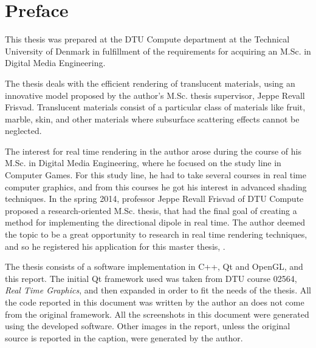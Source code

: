 \chapter{Preface}

\vspace{1cm}
This thesis was prepared at the DTU Compute department at the Technical University of Denmark in fulfillment of the requirements for acquiring an M.Sc. in Digital Media Engineering. 

The thesis deals with the efficient rendering of translucent materials, using an innovative model proposed by the author's M.Sc. thesis supervisor, Jeppe Revall Frisvad. Translucent materials consist of a particular class of materials like fruit, marble, skin, and other materials where subsurface scattering effects cannot be neglected. 

The interest for real time rendering in the author arose during the course of his M.Sc. in Digital Media Engineering, where he focused on the study line in Computer Games. For this study line, he had to take several courses in real time computer graphics, and from this courses he got his interest in advanced shading techniques. In the spring 2014, professor Jeppe Revall Frisvad of DTU Compute proposed a research-oriented M.Sc. thesis, that had the final goal of creating a method for implementing the directional dipole in real time. The author deemed the topic to be a great opportunity to research in real time rendering techniques, and so he registered his application for this master thesis, \emph{\thesistitle}.

The thesis consists of a software implementation in C++, Qt and OpenGL, and this report. The initial Qt framework used was taken from DTU course 02564, \emph{Real Time Graphics}, and then expanded in order to fit the needs of the thesis. All the code reported in this document was written by the author an does not come from the original framework. All the screenshots in this document were generated using the developed software. Other images in the report, unless the original source is reported in the caption, were generated by the author.

